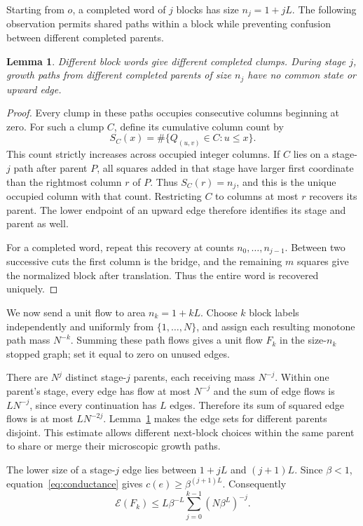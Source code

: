 \documentclass[11pt]{article}
\newtheorem{lemma}[theorem]{Lemma}
\begin{document}
Starting from $o$, a completed word of $j$ blocks has size $n_j=1+jL$.
The following observation permits shared paths within a block while
preventing confusion between different completed parents.

\begin{lemma}\label{lem:prefix}
Different block words give different completed clumps. During stage $j$,
growth paths from different completed parents of size $n_j$ have no
common state or upward edge.
\end{lemma}

\begin{proof}
Every clump in these paths occupies consecutive columns beginning at zero.
For such a clump $C$, define its cumulative column count by
\[
 S_C(x)=\#\{Q_{(u,v)}\in C:u\le x\}.
\]
This count strictly increases across occupied integer columns. If $C$
lies on a stage-$j$ path after parent $P$, all squares added in that
stage have larger first coordinate than the rightmost column $r$ of $P$.
Thus $S_C(r)=n_j$, and this is the unique occupied column with that
count. Restricting $C$ to columns at most $r$ recovers its parent.
The lower endpoint of an upward edge therefore identifies its stage
and parent as well.

For a completed word, repeat this recovery at counts
$n_0,\ldots,n_{j-1}$. Between two successive cuts the first column is the
bridge, and the remaining $m$ squares give the normalized block after
translation. Thus the entire word is recovered uniquely.
\end{proof}

We now send a unit flow to area $n_k=1+kL$. Choose $k$ block labels
independently and uniformly from $\{1,\ldots,N\}$, and assign each
resulting monotone path mass $N^{-k}$. Summing these path flows gives a
unit flow $F_k$ in the size-$n_k$ stopped graph; set it equal to zero on
unused edges.

There are $N^j$ distinct stage-$j$ parents, each receiving mass $N^{-j}$.
Within one parent's stage, every edge has flow at most $N^{-j}$ and the
sum of edge flows is $L N^{-j}$, since every continuation has $L$ edges.
Therefore its sum of squared edge flows is at most $L N^{-2j}$.
Lemma~\ref{lem:prefix} makes the edge sets for different parents disjoint.
This estimate allows different next-block choices within the same parent
to share or merge their microscopic growth paths.

The lower size of a stage-$j$ edge lies between $1+jL$ and $(j+1)L$.
Since $\beta<1$, equation~\eqref{eq:conductance} gives
$c(e)\ge\beta^{(j+1)L}$. Consequently
\begin{equation}\label{eq:flow-energy}
 \mathcal E(F_k)
 \le L\beta^{-L}\sum_{j=0}^{k-1}(N\beta^L)^{-j}.
\end{equation}
\end{document}

